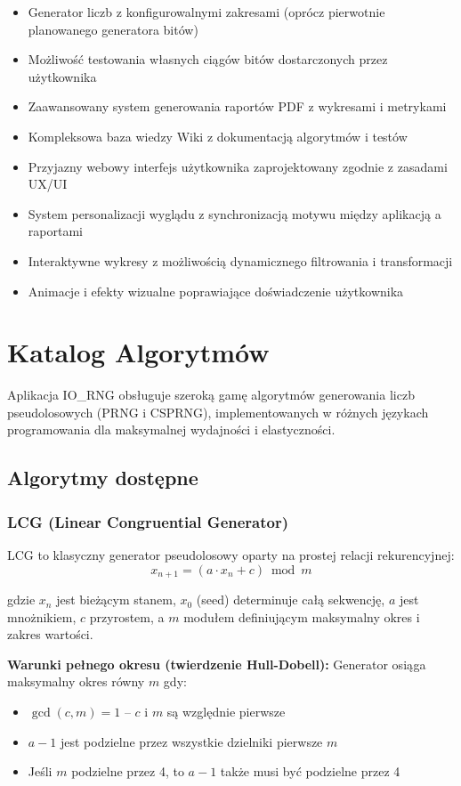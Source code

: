 \documentclass[12pt,a4paper]{article}
\begin{document}
\begin{itemize}
    \item Generator liczb z konfigurowalnymi zakresami (oprócz pierwotnie planowanego generatora bitów)
    \item Możliwość testowania własnych ciągów bitów dostarczonych przez użytkownika
    \item Zaawansowany system generowania raportów PDF z wykresami i metrykami
    \item Kompleksowa baza wiedzy Wiki z dokumentacją algorytmów i testów
    \item Przyjazny webowy interfejs użytkownika zaprojektowany zgodnie z zasadami UX/UI
    \item System personalizacji wyglądu z synchronizacją motywu między aplikacją a raportami
    \item Interaktywne wykresy z możliwością dynamicznego filtrowania i transformacji
    \item Animacje i efekty wizualne poprawiające doświadczenie użytkownika
\end{itemize}

\newpage
\section{Katalog Algorytmów}

Aplikacja IO\_RNG obsługuje szeroką gamę algorytmów generowania liczb pseudolosowych (PRNG i CSPRNG), implementowanych w różnych językach programowania dla maksymalnej wydajności i elastyczności.

\subsection{Algorytmy dostępne}

\subsubsection{LCG (Linear Congruential Generator)}

LCG to klasyczny generator pseudolosowy oparty na prostej relacji rekurencyjnej:
$$x_{n+1} = (a \cdot x_n + c) \bmod m$$

gdzie $x_n$ jest bieżącym stanem, $x_0$ (seed) determinuje całą sekwencję, $a$ jest mnożnikiem, $c$ przyrostem, a $m$ modułem definiującym maksymalny okres i zakres wartości.

\textbf{Warunki pełnego okresu (twierdzenie Hull-Dobell):}
Generator osiąga maksymalny okres równy $m$ gdy:
\begin{itemize}
    \item $\gcd(c, m) = 1$ – $c$ i $m$ są względnie pierwsze
    \item $a - 1$ jest podzielne przez wszystkie dzielniki pierwsze $m$
    \item Jeśli $m$ podzielne przez 4, to $a - 1$ także musi być podzielne przez 4
\end{itemize}
\end{document}
